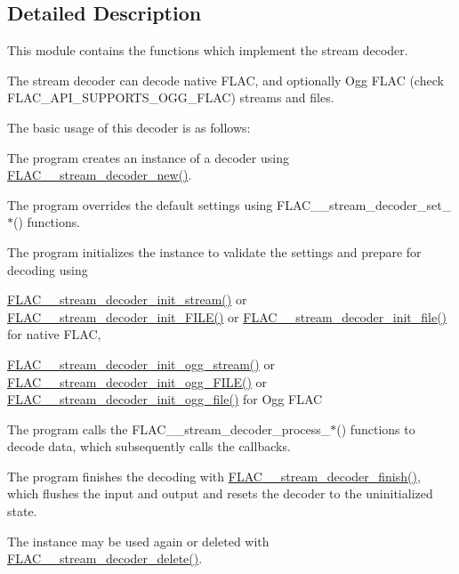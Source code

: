 \subsection{Detailed Description}
This module contains the functions which implement the stream decoder. 

The stream decoder can decode native F\+L\+AC, and optionally Ogg F\+L\+AC (check F\+L\+A\+C\+\_\+\+A\+P\+I\+\_\+\+S\+U\+P\+P\+O\+R\+T\+S\+\_\+\+O\+G\+G\+\_\+\+F\+L\+AC) streams and files.

The basic usage of this decoder is as follows\+:
\begin{DoxyItemize}
\item The program creates an instance of a decoder using \mbox{\hyperlink{group__flac__stream__decoder_ga7159eefc074dfbab4a37462f69326091}{F\+L\+A\+C\+\_\+\+\_\+stream\+\_\+decoder\+\_\+new()}}.
\item The program overrides the default settings using F\+L\+A\+C\+\_\+\+\_\+stream\+\_\+decoder\+\_\+set\+\_\+$\ast$() functions.
\item The program initializes the instance to validate the settings and prepare for decoding using
\begin{DoxyItemize}
\item \mbox{\hyperlink{group__flac__stream__decoder_ga32c28a56a2bdfa2333edbd3d991894d7}{F\+L\+A\+C\+\_\+\+\_\+stream\+\_\+decoder\+\_\+init\+\_\+stream()}} or \mbox{\hyperlink{group__flac__stream__decoder_ga38f9eb46bf112af205f86b4cbac9980c}{F\+L\+A\+C\+\_\+\+\_\+stream\+\_\+decoder\+\_\+init\+\_\+\+F\+I\+L\+E()}} or \mbox{\hyperlink{group__flac__stream__decoder_ga1692108a97012d1c5f79baf7df012c33}{F\+L\+A\+C\+\_\+\+\_\+stream\+\_\+decoder\+\_\+init\+\_\+file()}} for native F\+L\+AC,
\item \mbox{\hyperlink{group__flac__stream__decoder_ga78bf285b54e5aaee73a214c108683a72}{F\+L\+A\+C\+\_\+\+\_\+stream\+\_\+decoder\+\_\+init\+\_\+ogg\+\_\+stream()}} or \mbox{\hyperlink{group__flac__stream__decoder_gac6a35b1db07e057ec9912f637b37dd74}{F\+L\+A\+C\+\_\+\+\_\+stream\+\_\+decoder\+\_\+init\+\_\+ogg\+\_\+\+F\+I\+L\+E()}} or \mbox{\hyperlink{group__flac__stream__decoder_ga609f2a43987d6abeaef654575462030c}{F\+L\+A\+C\+\_\+\+\_\+stream\+\_\+decoder\+\_\+init\+\_\+ogg\+\_\+file()}} for Ogg F\+L\+AC
\end{DoxyItemize}
\item The program calls the F\+L\+A\+C\+\_\+\+\_\+stream\+\_\+decoder\+\_\+process\+\_\+$\ast$() functions to decode data, which subsequently calls the callbacks.
\item The program finishes the decoding with \mbox{\hyperlink{group__flac__stream__decoder_gaa51bb38f762ee11b320a0839f165c5ce}{F\+L\+A\+C\+\_\+\+\_\+stream\+\_\+decoder\+\_\+finish()}}, which flushes the input and output and resets the decoder to the uninitialized state.
\item The instance may be used again or deleted with \mbox{\hyperlink{group__flac__stream__decoder_gab958ee28b829be37e541946676ad9677}{F\+L\+A\+C\+\_\+\+\_\+stream\+\_\+decoder\+\_\+delete()}}.
\end{DoxyItemize}

